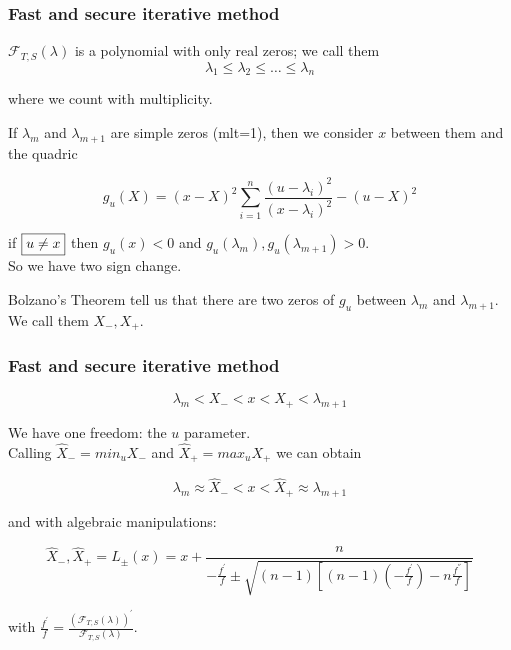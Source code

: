\documentclass{beamer}
\newcommand{\effe}[2]{\mathcal{F}_{#1}(#2)}
\theoremstyle{definition} \newtheorem{de}{Def}
\theoremstyle{remark} \newtheorem{os}[de]{Remark}
\theoremstyle{plain} \newtheorem{te}[de]{Teo}
\theoremstyle{plain} \newtheorem{co}[de]{Cor}
\theoremstyle{plain} \newtheorem{pr}[de]{Prop}
\theoremstyle{plain} \newtheorem{lem}[de]{Lemm}
\theoremstyle{remark} \newtheorem{rem}[de]{Remark}
\begin{document}
\begin{frame}
\frametitle{Fast and secure iterative method}

$\effe{T,S}{\lambda}$ is a polynomial with only real zeros; we call them
\begin{equation*}
  \lambda_1 \le \lambda_2 \le \dots \le \lambda_n
\end{equation*}

where we count with multiplicity.\\ 

\pause 

If $\lambda_m$ and $\lambda_{m+1}$ are simple zeros (mlt=1), then we consider $x$ between them and the quadric

\pause

\begin{equation*}
  g_{u}(X) = (x-X)^2 \sum_{i=1}^n \frac{(u-\lambda_i)^2}{(x-\lambda_i)^2} - (u-X)^2
\end{equation*}

\pause

if $\fbox{$u\neq x$}$ then $g_{u}(x)<0$ and $g_u(\lambda_m),g_u(\lambda_{m+1})>0$. \\
So we have two sign change. \\

\pause

Bolzano's Theorem tell us that there are two zeros of $g_{u}$ between $\lambda_m$ and $\lambda_{m+1}$. We call them $X_{-},X_{+}$.

\end{frame}

\begin{frame}
\frametitle{Fast and secure iterative method}

\begin{equation*}
  \lambda_m < X_{-} < x < X_{+} < \lambda_{m+1}
\end{equation*}

We have one freedom: the $u$ parameter. \\
Calling $\hat X_{-}=min_{u} X_{-}$ and $\hat X_{+}=max_{u} X_{+}$  we can obtain


\begin{equation*}
  \lambda_m \approx \hat X_{-} < x < \hat X_{+} \approx \lambda_{m+1}
\end{equation*}

and with algebraic manipulations: 

\begin{equation*}
  \hat X_{-}, \hat X_{+} = L_{\pm}(x) = x + \frac{ n }{ -\frac{f^{'}}{f} \pm \sqrt{(n-1)[ (n-1)(-\frac{f^{'}}{f}) -n\frac{f^{''}}{f} ]} }
\end{equation*}

with $\frac{f^{'}}{f}=\frac{ (\effe{T,S}{\lambda})^{'} }{ \effe{T,S}{\lambda} }$. 

\end{frame}
\end{document}
